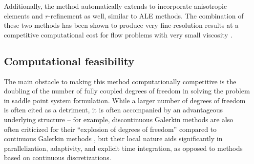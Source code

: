 \documentclass[final,leqno]{siamltex}
\begin{document}
Additionally, the method automatically extends to incorporate anisotropic elements and $r$-refinement as well, similar to ALE methods.  The combination of these two methods has been shown to produce very fine-resolution results at a competitive computational cost for flow problems with very small viscosity \cite{AlmeidaAnisotropy}.  

\subsection{Computational feasibility}

The main obstacle to making this method computationally competitive is the doubling of the number of fully coupled degrees of freedom in solving the problem in saddle point system formulation.  While a larger number of degrees of freedom is often cited as a detriment, it is often accompanied by an advantageous underlying structure -- for example, discontinuous Galerkin methods are also often criticized for their ``explosion of degrees of freedom'' compared to continuous Galerkin methods \cite{cottrell2007isogeometric}, but their local nature aids significantly in parallelization, adaptivity, and explicit time integration, as opposed to methods based on continuous discretizations.  
\end{document}
